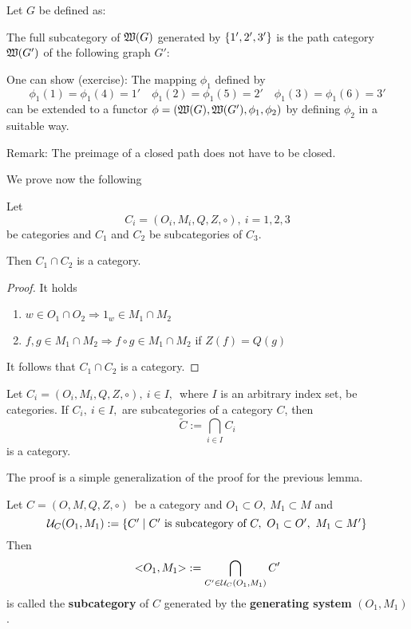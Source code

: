 \bigskip
\begin{example}
Let $G$ be defined as:

\begin{center}

\end{center}

The full subcategory of $\mbox{$\mathfrak{W}({G})$}$ generated by $\mbox{$\{1', 2', 3'\}$}$ is the
path category $\mbox{$\mathfrak{W}({G'})$}$ of the following graph $G'$:

\begin{center}

\end{center}

One can show (exercise): The mapping $\phi_1$ defined by 
\[ \phi_1(1) = \phi_1(4) = 1' \quad \phi_1(2) = \phi_1(5) = 2'
 \quad \phi_1(3) = \phi_1(6) = 3' \]
can be extended to a functor $\phi = (\mbox{$\mathfrak{W}({G})$}, \mbox{$\mathfrak{W}({G'})$}, \phi_1,
\phi_2)$ by defining $\phi_2$ in a suitable way.
\end{example}

Remark: The preimage of a closed path does not have to be closed.

We prove now the following
\begin{lemma}
Let \[ C_i = (O_i, M_i, Q, Z, \circ),\ i = 1, 2, 3 \] be categories and $C_1$
and $C_2$ be subcategories of $C_3$. 

Then $C_1 \cap C_2$ is a category.
\end{lemma}

\begin{proof}
It holds
\begin{enumerate}
  \item $w \in O_1 \cap O_2 \Rightarrow 1_w \in M_1 \cap M_2$
  \item $f, g \in M_1 \cap M_2 \Rightarrow f \circ g \in M_1 \cap M_2$ if
  $Z(f) = Q(g)$
\end{enumerate}
It follows that $C_1 \cap C_2$ is a category.
\end{proof}

\bigskip
\begin{lemma}
Let $ C_i = (O_i, M_i, Q, Z, \circ),\ i \in I,$\ where $I$ is an arbitrary
index set, be categories. If $C_i,\ i \in I,$ are subcategories of a category
$C$, then 
\[ \tilde{C} := \bigcap_{i \in I} C_i \] 
is a category.
\end{lemma}
The proof is a simple generalization of the proof for the previous lemma.

\bigskip
\begin{definition}
Let $C = (O, M, Q, Z, \circ)$\ be a category and $O_1 \subset O,\ M_1 \subset M$
and 
\[ \mathcal{U}_C(O_1, M_1) := \mbox{$\{C' \mid C'\text{ is subcategory of }C,\
O_1 \subset O',\ M_1 \subset M'\}$} \]
Then
\[ \mbox{${<}{O_1},{M_1}{>}$} := \bigcap_{C' \in \mathcal{U}_C(O_1, M_1)} C' \]
is called the {\bf subcategory} of $C$ generated by the {\bf generating system}
$(O_1, M_1)$.
\end{definition}

